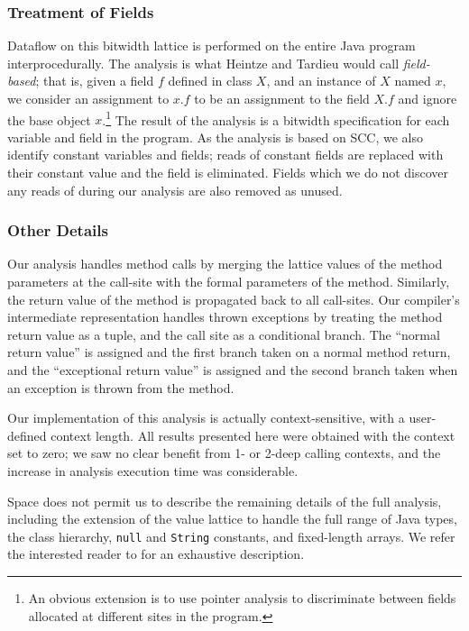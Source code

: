 \documentclass[oribibl]{llncs}
\begin{document}
\subsubsection{Treatment of Fields}
Dataflow on this bitwidth lattice is performed on the entire Java
program interprocedurally.  The analysis is what Heintze and Tardieu
\cite{heintze01}
would call {\it field-based}; that is, given a field $f$ defined in
class $X$, and an instance of $X$ named $x$, we consider an assignment
to $x.f$ to be an assignment to the field $X.f$ and ignore the base
object $x$.\footnote{An obvious extension is to use pointer
analysis to discriminate between fields allocated at different sites
in the program.}  The result of the analysis is a bitwidth
specification for each variable and field in the program.  As the
analysis is based on SCC, we also identify constant variables and
fields; reads of constant fields are replaced with their constant
value and the field is eliminated.  Fields which we do not discover
any reads of during our analysis are also removed as unused.

\subsubsection{Other Details}
Our analysis handles method calls by merging the lattice values of the
method parameters at the call-site with the formal parameters of the
method.  Similarly, the return value of the method is propagated back
to all call-sites.  Our compiler's intermediate representation handles
thrown exceptions by treating the method return value as a tuple, and
the call site as a conditional branch.  The ``normal return value'' is
assigned and the first branch taken on a normal method return, and the
``exceptional return value'' is assigned and the second branch taken when an
exception is thrown from the method.

Our implementation of this analysis is actually context-sensitive,
with a user-defined context length.  All results presented here were
obtained with the context set to zero; we saw no clear benefit from 1-
or 2-deep calling contexts, and the increase in analysis execution
time was considerable.

Space does not permit us to describe the remaining details of the full
analysis, including the extension of the value
lattice to handle the full range of Java types, the class hierarchy,
{\tt null} and {\tt String} constants, and fixed-length arrays.
We refer the interested reader to \cite{ananian99:tech} for an
exhaustive description.
\end{document}
